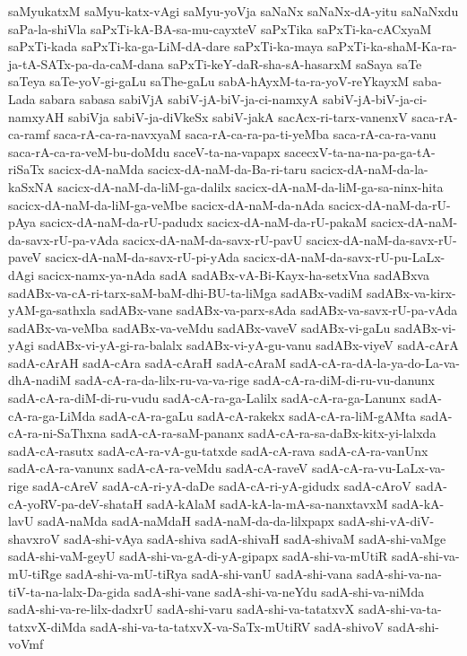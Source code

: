 {saMyukatxM
saMyu-katx-vAgi
saMyu-yoVja
saNaNx
saNaNx-dA-yitu
saNaNxdu
saPa-la-shiVla
saPxTi-kA-BA-sa-mu-cayxteV
saPxTika
saPxTi-ka-cACxyaM
saPxTi-kada
saPxTi-ka-ga-LiM-dA-dare
saPxTi-ka-maya
saPxTi-ka-shaM-Ka-ra-ja-tA-SATx-pa-da-caM-dana
saPxTi-keY-daR-sha-sA-hasarxM
saSaya
saTe
saTeya
saTe-yoV-gi-gaLu
saThe-gaLu
sabA-hAyxM-ta-ra-yoV-reYkayxM
saba-Lada
sabara
sabasa
sabiVjA
sabiV-jA-biV-ja-ci-namxyA
sabiV-jA-biV-ja-ci-namxyAH
sabiVja
sabiV-ja-diVkeSx
sabiV-jakA
sacAcx-ri-tarx-vanenxV
saca-rA-ca-ramf
saca-rA-ca-ra-navxyaM
saca-rA-ca-ra-pa-ti-yeMba
saca-rA-ca-ra-vanu
saca-rA-ca-ra-veM-bu-doMdu
saceV-ta-na-vapapx
sacecxV-ta-na-na-pa-ga-tA-riSaTx
sacicx-dA-naMda
sacicx-dA-naM-da-Ba-ri-taru
sacicx-dA-naM-da-la-kaSxNA
sacicx-dA-naM-da-liM-ga-dalilx
sacicx-dA-naM-da-liM-ga-sa-ninx-hita
sacicx-dA-naM-da-liM-ga-veMbe
sacicx-dA-naM-da-nAda
sacicx-dA-naM-da-rU-pAya
sacicx-dA-naM-da-rU-padudx
sacicx-dA-naM-da-rU-pakaM
sacicx-dA-naM-da-savx-rU-pa-vAda
sacicx-dA-naM-da-savx-rU-pavU
sacicx-dA-naM-da-savx-rU-paveV
sacicx-dA-naM-da-savx-rU-pi-yAda
sacicx-dA-naM-da-savx-rU-pu-LaLx-dAgi
sacicx-namx-ya-nAda
sadA
sadABx-vA-Bi-Kayx-ha-setxVna
sadABxva
sadABx-va-cA-ri-tarx-saM-baM-dhi-BU-ta-liMga
sadABx-vadiM
sadABx-va-kirx-yAM-ga-sathxla
sadABx-vane
sadABx-va-parx-sAda
sadABx-va-savx-rU-pa-vAda
sadABx-va-veMba
sadABx-va-veMdu
sadABx-vaveV
sadABx-vi-gaLu
sadABx-vi-yAgi
sadABx-vi-yA-gi-ra-balalx
sadABx-vi-yA-gu-vanu
sadABx-viyeV
sadA-cArA
sadA-cArAH
sadA-cAra
sadA-cAraH
sadA-cAraM
sadA-cA-ra-dA-la-ya-do-La-va-dhA-nadiM
sadA-cA-ra-da-lilx-ru-va-va-rige
sadA-cA-ra-diM-di-ru-vu-danunx
sadA-cA-ra-diM-di-ru-vudu
sadA-cA-ra-ga-Lalilx
sadA-cA-ra-ga-Lanunx
sadA-cA-ra-ga-LiMda
sadA-cA-ra-gaLu
sadA-cA-rakekx
sadA-cA-ra-liM-gAMta
sadA-cA-ra-ni-SaThxna
sadA-cA-ra-saM-pananx
sadA-cA-ra-sa-daBx-kitx-yi-lalxda
sadA-cA-rasutx
sadA-cA-ra-vA-gu-tatxde
sadA-cA-rava
sadA-cA-ra-vanUnx
sadA-cA-ra-vanunx
sadA-cA-ra-veMdu
sadA-cA-raveV
sadA-cA-ra-vu-LaLx-va-rige
sadA-cAreV
sadA-cA-ri-yA-daDe
sadA-cA-ri-yA-gidudx
sadA-cAroV
sadA-cA-yoRV-pa-deV-shataH
sadA-kAlaM
sadA-kA-la-mA-sa-nanxtavxM
sadA-kA-lavU
sadA-naMda
sadA-naMdaH
sadA-naM-da-da-lilxpapx
sadA-shi-vA-diV-shavxroV
sadA-shi-vAya
sadA-shiva
sadA-shivaH
sadA-shivaM
sadA-shi-vaMge
sadA-shi-vaM-geyU
sadA-shi-va-gA-di-yA-gipapx
sadA-shi-va-mUtiR
sadA-shi-va-mU-tiRge
sadA-shi-va-mU-tiRya
sadA-shi-vanU
sadA-shi-vana
sadA-shi-va-na-tiV-ta-na-lalx-Da-gida
sadA-shi-vane
sadA-shi-va-neYdu
sadA-shi-va-niMda
sadA-shi-va-re-lilx-dadxrU
sadA-shi-varu
sadA-shi-va-tatatxvX
sadA-shi-va-ta-tatxvX-diMda
sadA-shi-va-ta-tatxvX-va-SaTx-mUtiRV
sadA-shivoV
sadA-shi-voVmf
}
